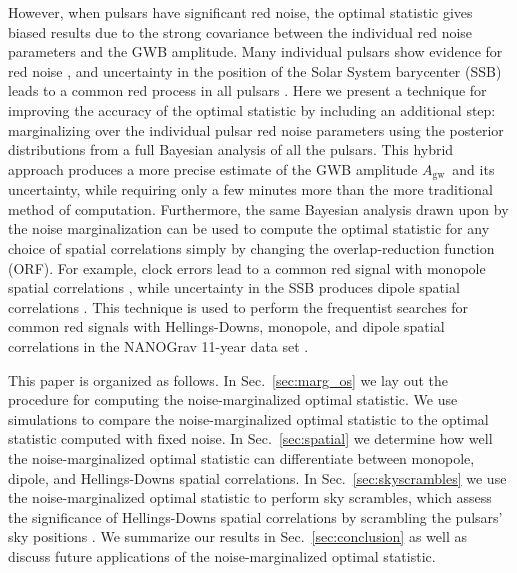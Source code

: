 \documentclass[twocolumn,aps,prd,superscriptaddress]{revtex4-1}
\newcommand{\Agw}{\ensuremath{A_\mathrm{gw}}}
\begin{document}
However, when pulsars have significant red noise, 
the optimal statistic gives biased results 
due to the strong covariance 
between the individual red noise parameters and the GWB amplitude. 
Many individual pulsars show evidence for red noise \citep{lam+2017,abb+17}, 
and uncertainty in the position of the Solar System barycenter (SSB) leads to 
a common red process in all pulsars \citep{abb+17b}. 
Here we present a technique for improving the accuracy of the optimal statistic by including an additional step: 
marginalizing over the individual pulsar red noise parameters 
using the posterior distributions from a full Bayesian analysis of all the pulsars. 
This hybrid approach produces a more precise estimate of the GWB amplitude \Agw\ 
and its uncertainty, while requiring only a few minutes more than the more traditional method of computation. 
Furthermore, the same Bayesian analysis drawn upon by the noise marginalization 
can be used to compute the optimal statistic for any choice of spatial correlations 
simply by changing the overlap-reduction function (ORF). 
For example, clock errors lead to a common red signal with monopole spatial correlations \citep{hcm+2012}, 
while uncertainty in the SSB produces dipole spatial correlations \citep{chm+2010}. 
This technique is used to perform the frequentist searches 
for common red signals with Hellings-Downs, 
monopole, and dipole spatial correlations 
in the NANOGrav 11-year data set \citep{abb+17b}.

This paper is organized as follows. In Sec.~\ref{sec:marg_os} 
we lay out the procedure for computing the noise-marginalized optimal statistic. 
We use simulations to compare the noise-marginalized optimal statistic 
to the optimal statistic computed with fixed noise. 
In Sec.~\ref{sec:spatial} we determine how well 
the noise-marginalized optimal statistic can 
differentiate between monopole, dipole, and Hellings-Downs spatial correlations. 
In Sec.~\ref{sec:skyscrambles} we use the noise-marginalized optimal statistic 
to perform sky scrambles, 
which assess the significance of Hellings-Downs spatial correlations 
by scrambling the pulsars' sky positions \citep{cs2016, tlb+2017}. 
We summarize our results in Sec.~\ref{sec:conclusion} 
as well as discuss future applications of the noise-marginalized optimal statistic.
\end{document}
